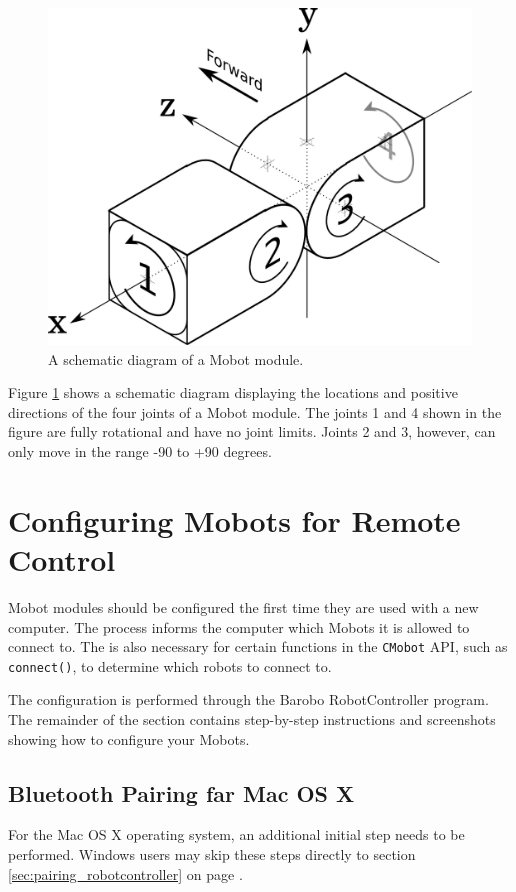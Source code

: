 \documentclass{article}
\begin{document}
\begin{figure}[H]
\begin{center}
\includegraphics[width=4.5in]{images/joint_diagram_verbose.png}
\end{center}
\caption{\label{fig:joint_diagram_verbose.png} A schematic diagram of a Mobot module.}
\end{figure}

Figure \ref{fig:joint_diagram_verbose.png} shows a schematic diagram displaying the
locations and positive directions of the four joints of a Mobot module. The
joints 1 and 4 shown in the figure are fully rotational and have no joint limits.
Joints 2 and 3, however, can only move in the range -90 to +90 degrees.


\section{\label{sec:pairing}Configuring Mobots for Remote Control}
Mobot modules should be configured the first time they are used with 
a new computer. The process informs the computer which Mobots it
is allowed to connect to. The is also necessary for certain 
functions in the \texttt{CMobot} API, such as \texttt{connect()},
to determine which robots to connect to.

The configuration is performed through the Barobo RobotController
program. The remainder of the section contains step-by-step instructions
and screenshots showing how to configure your Mobots.

\subsection{Bluetooth Pairing far Mac OS X}
For the Mac OS X operating system, an additional initial step needs to be performed.
Windows users may skip these steps directly to section \ref{sec:pairing_robotcontroller}
on page \pageref{sec:pairing_robotcontroller}.
\end{document}
